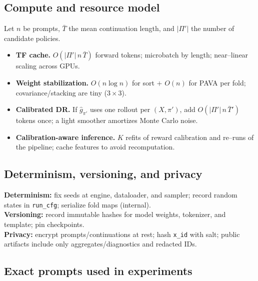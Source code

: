 \subsection{Compute and resource model}
\label{app:impl-compute}
Let $n$ be prompts, $\bar T$ the mean continuation length, and $|\Pi'|$ the number of candidate policies.
\begin{itemize}[leftmargin=*,itemsep=2pt,topsep=2pt]
\item \textbf{TF cache.} $O(|\Pi'|\,n\,\bar T)$ forward tokens; microbatch by length; near–linear scaling across GPUs.
\item \textbf{Weight stabilization.} $O(n\log n)$ for sort $+$ $O(n)$ for PAVA per fold; covariance/stacking are tiny ($3{\times}3$).
\item \textbf{Calibrated DR.} If $\hat g_{\pi'}$ uses one rollout per $(X,\pi')$, add $O(|\Pi'|\,n\,\bar T')$ tokens once; a light smoother amortizes Monte Carlo noise.
\item \textbf{Calibration-aware inference.} $K$ refits of reward calibration and re–runs of the pipeline; cache features to avoid recomputation.
\end{itemize}

\subsection{Determinism, versioning, and privacy}
\label{app:impl-determinism}
\textbf{Determinism:} fix seeds at engine, dataloader, and sampler; record random states in \texttt{run\_cfg}; serialize fold maps (internal). \\
\textbf{Versioning:} record immutable hashes for model weights, tokenizer, and template; pin checkpoints. \\
\textbf{Privacy:} encrypt prompts/continuations at rest; hash \texttt{x\_id} with salt; public artifacts include only aggregates/diagnostics and redacted IDs.

\subsection{Exact prompts used in experiments}
\label{app:impl-prompts}

